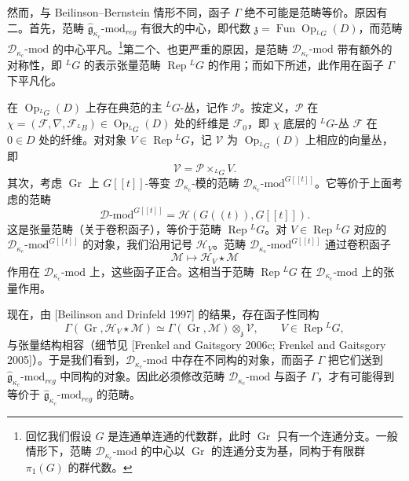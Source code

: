 然而，与 Beilinson--Bernstein 情形不同，函子 $\Gamma$ 绝不可能是范畴等价。原因有二。首先，范畴 $\hat{\mathfrak{g}}_{\kappa_c}\text{-mod}_{reg}$ 有很大的中心，即代数 $\mathfrak{z}=\operatorname{Fun}\operatorname{Op}_{{}^LG}(D)$，而范畴 $\mathcal{D}_{\kappa_c}\text{-mod}$ 的中心平凡。\footnote{回忆我们假设 $G$ 是连通单连通的代数群，此时 $\operatorname{Gr}$ 只有一个连通分支。一般情形下，范畴 $\mathcal{D}_{\kappa_c}\text{-mod}$ 的中心以 $\operatorname{Gr}$ 的连通分支为基，同构于有限群 $\pi_1(G)$ 的群代数。}第二个、也更严重的原因，是范畴 $\mathcal{D}_{\kappa_c}\text{-mod}$ 带有额外的对称性，即 ${}^LG$ 的表示张量范畴 $\operatorname{Rep}{}^LG$ 的作用；而如下所述，此作用在函子 $\Gamma$ 下平凡化。


在 $\operatorname{Op}_{{}^LG}(D)$ 上存在典范的主 ${}^LG$-丛，记作 $\mathcal{P}$。按定义，$\mathcal{P}$ 在 $\chi=(\mathcal{F},\nabla,\mathcal{F}_{{}^LB})\in\operatorname{Op}_{{}^LG}(D)$ 处的纤维是 $\mathcal{F}_0$，即 $\chi$ 底层的 ${}^LG$-丛 $\mathcal{F}$ 在 $0\in D$ 处的纤维。对对象 $V\in\operatorname{Rep}{}^LG$，记 $\mathcal{V}$ 为 $\operatorname{Op}_{{}^LG}(D)$ 上相应的向量丛，即
\[
    \mathcal{V}=\mathcal{P}\times_{{}^LG}V.
\]
其次，考虑 $\operatorname{Gr}$ 上 $G[[t]]$-等变 $\mathcal{D}_{\kappa_c}$-模的范畴 $\mathcal{D}_{\kappa_c}\text{-mod}^{G[[t]]}$。它等价于上面考虑的范畴
\[
    \mathcal{D}\text{-mod}^{G[[t]]}=\mathcal{H}(G((t)),G[[t]]).
\]
这是张量范畴（关于卷积函子），等价于范畴 $\operatorname{Rep}{}^LG$。对 $V\in\operatorname{Rep}{}^LG$ 对应的 $\mathcal{D}_{\kappa_c}\text{-mod}^{G[[t]]}$ 的对象，我们沿用记号 $\mathcal{H}_V$。范畴 $\mathcal{D}_{\kappa_c}\text{-mod}^{G[[t]]}$ 通过卷积函子
\[
    \mathcal{M}\mapsto\mathcal{H}_V\star\mathcal{M}
\]
作用在 $\mathcal{D}_{\kappa_c}\text{-mod}$ 上，这些函子正合。这相当于范畴 $\operatorname{Rep}{}^LG$ 在 $\mathcal{D}_{\kappa_c}\text{-mod}$ 上的张量作用。

现在，由 [Beilinson and Drinfeld 1997] 的结果，存在函子性同构
\[
    \Gamma(\operatorname{Gr},\mathcal{H}_V\star\mathcal{M})
    \simeq\Gamma(\operatorname{Gr},\mathcal{M})\otimes_{\mathfrak{z}}\mathcal{V},
    \qquad V\in\operatorname{Rep}{}^LG,
\]
与张量结构相容（细节见 [Frenkel and Gaitsgory 2006c; Frenkel and Gaitsgory 2005]）。于是我们看到，$\mathcal{D}_{\kappa_c}\text{-mod}$ 中存在不同构的对象，而函子 $\Gamma$ 把它们送到 $\hat{\mathfrak{g}}_{\kappa_c}\text{-mod}_{reg}$ 中同构的对象。因此必须修改范畴 $\mathcal{D}_{\kappa_c}\text{-mod}$ 与函子 $\Gamma$，才有可能得到等价于 $\hat{\mathfrak{g}}_{\kappa_c}\text{-mod}_{reg}$ 的范畴。

